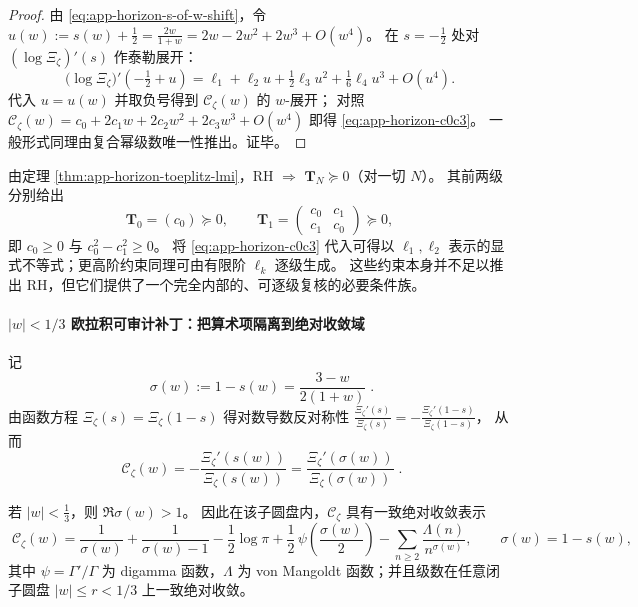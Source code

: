 \begin{proof}
由 \eqref{eq:app-horizon-s-of-w-shift}，令 \(u(w):=s(w)+\tfrac12=\frac{2w}{1+w}=2w-2w^2+2w^3+O(w^4)\)。
在 \(s=-\tfrac12\) 处对 \( (\log\Xi_{\zeta})'(s) \) 作泰勒展开：
\[
\bigl(\log\Xi_{\zeta}\bigr)'\!\left(-\tfrac12+u\right)
=\ell_1+\ell_2 u+\tfrac12\ell_3 u^2+\tfrac16\ell_4 u^3+O(u^4).
\]
代入 \(u=u(w)\) 并取负号得到 \(\mathscr{C}_{\zeta}(w)\) 的 \(w\)-展开；
对照 \(\mathscr{C}_{\zeta}(w)=c_0+2c_1w+2c_2w^2+2c_3w^3+O(w^4)\) 即得 \eqref{eq:app-horizon-c0c3}。
一般形式同理由复合幂级数唯一性推出。证毕。
\end{proof}

\begin{remark}\label{rem:app-horizon-low-level-psd}
由定理 \ref{thm:app-horizon-toeplitz-lmi}，RH \(\Rightarrow\) \(\mathbf{T}_N\succeq 0\)（对一切 \(N\)）。
其前两级分别给出
\[
\mathbf{T}_0=(c_0)\succeq 0,
\qquad
\mathbf{T}_1=\begin{pmatrix}c_0&c_1\\c_1&c_0\end{pmatrix}\succeq 0,
\]
即 \(c_0\ge 0\) 与 \(c_0^2-c_1^2\ge 0\)。
将 \eqref{eq:app-horizon-c0c3} 代入可得以 \(\ell_1,\ell_2\) 表示的显式不等式；更高阶约束同理可由有限阶 \(\ell_k\) 逐级生成。
这些约束本身并不足以推出 RH，但它们提供了一个完全内部的、可逐级复核的必要条件族。
\end{remark}

\paragraph{\texorpdfstring{$|w|<1/3$}{|w|<1/3} 欧拉积可审计补丁：把算术项隔离到绝对收敛域}
记
\begin{equation}\label{eq:app-horizon-sigma-def}
\boxed{\;\sigma(w):=1-s(w)=\frac{3-w}{2(1+w)}\; }.
\end{equation}
由函数方程 \(\Xi_{\zeta}(s)=\Xi_{\zeta}(1-s)\) 得对数导数反对称性
\(
\frac{\Xi_{\zeta}'(s)}{\Xi_{\zeta}(s)}=-\frac{\Xi_{\zeta}'(1-s)}{\Xi_{\zeta}(1-s)}
\)，
从而
\begin{equation}\label{eq:app-horizon-fe-rewrite}
\boxed{\;
\mathscr{C}_{\zeta}(w)
=-\frac{\Xi_{\zeta}'(s(w))}{\Xi_{\zeta}(s(w))}
=\frac{\Xi_{\zeta}'(\sigma(w))}{\Xi_{\zeta}(\sigma(w))}\; }.
\end{equation}

\begin{theorem}\label{thm:app-horizon-euler-patch}
若 \(|w|<\frac13\)，则 \(\Re\sigma(w)>1\)。
因此在该子圆盘内，\(\mathscr{C}_{\zeta}\) 具有一致绝对收敛表示
\begin{equation}\label{eq:app-horizon-euler-patch}
\boxed{\;
\mathscr{C}_{\zeta}(w)=\frac{1}{\sigma(w)}+\frac{1}{\sigma(w)-1}
-\frac12\log\pi+\frac12\,\psi\!\left(\frac{\sigma(w)}{2}\right)
-\sum_{n\ge2}\frac{\Lambda(n)}{n^{\sigma(w)}},\qquad \sigma(w)=1-s(w),\;}
\end{equation}
其中 \(\psi=\Gamma'/\Gamma\) 为 digamma 函数，\(\Lambda\) 为 von Mangoldt 函数；并且级数在任意闭子圆盘 \(|w|\le r<1/3\) 上一致绝对收敛。
\end{theorem}

